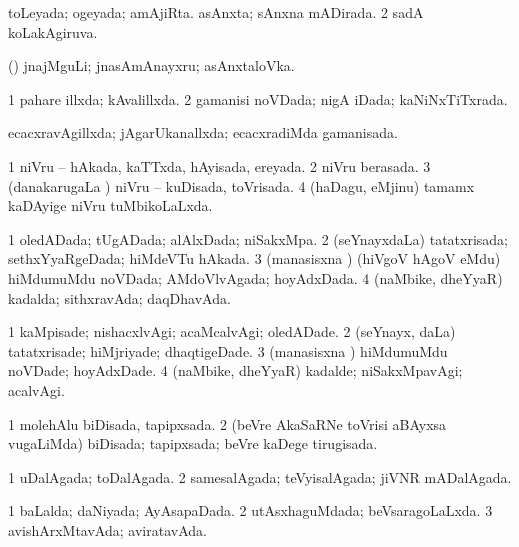 {{\bentry
{} 
\gl{\gu}
\expl{}
\bmng
\bnum
{} 
\banum
{} toLeyada; ogeyada; amAjiRta. 
 asAnxta; sAnxna mADirada. 
\eanum
\numie
\num{2} sadA koLakAgiruva. 
\enum
\emng

\noindent
\gl{\pagu}
\expl{}
\bmng
{} (\AmA) jnajMguLi; jnasAmAnayxru; asAnxtaloVka. 
\emng
\eentry

\bentry 
{} 
\gl{\gu}
\expl{}
\bmng
\bnum
\num{1} pahare illxda; kAvalillxda. 
\num{2} gamanisi noVDada; nigA iDada; kaNiNxTiTxrada. 
\enum
\emng
\eentry

\bentry
{} 
\gl{\gu}
\expl{}
\bmng
ecacxravAgillxda; jAgarUkanallxda; ecacxradiMda gamanisada. 
\emng
\eentry

\bentry
{} 
\gl{\gu}
\expl{}
\bmng
\bnum
\num{1} niVru -- hAkada, kaTTxda, hAyisada, ereyada. 
\num{2} niVru berasada. 
\num{3} (danakarugaLa \vi) niVru -- kuDisada, toVrisada. 
\num{4} (haDagu, eMjinu) tamamx kaDAyige niVru tuMbikoLaLxda. 
\enum
\emng
\eentry

\bentry
{} 
\gl{\gu}
\expl{}
\bmng
\bnum
\num{1} oledADada; tUgADada; alAlxDada; niSakxMpa. 
\num{2} (seYnayxdaLa) tatatxrisada; sethxYyaRgeDada; hiMdeVTu hAkada. 
\num{3} (manasisxna \vi) (hiVgoV hAgoV eMdu) hiMdumuMdu noVDada; AMdoVlvAgada; hoyAdxDada. 
\num{4} (naMbike, dheYyaR) kadalda; sithxravAda; daqDhavAda. 
\enum
\emng
\eentry

\bentry
{} 
\gl{\kirxvi}
\expl{}
\bmng
\bnum
\num{1} kaMpisade; nishacxlvAgi; acaMcalvAgi; oledADade. 
\num{2} (seYnayx, daLa) tatatxrisade; hiMjriyade; dhaqtigeDade. 
\num{3} (manasisxna \vi) hiMdumuMdu noVDade; hoyAdxDade. 
\num{4} (naMbike, dheYyaR) kadalde; niSakxMpavAgi; acalvAgi. 
\enum
\emng
\eentry

\bentry
{} 
\gl{\gu}
\expl{}
\bmng
\bnum
\num{1} molehAlu biDisada, tapipxsada. 
\num{2} (beVre AkaSaRNe toVrisi aBAyxsa \mo vugaLiMda) biDisada; tapipxsada; beVre kaDege tirugisada. 
\enum
\emng
\eentry

\bentry
{} 
\gl{\gu}
\expl{}
\bmng
\bnum
\num{1} uDalAgada; toDalAgada. 
\num{2} samesalAgada; teVyisalAgada; jiVNR mADalAgada. 
\enum
\emng
\eentry

\bentry
{} 
\gl{\gu}
\expl{}
\bmng
\bnum
\num{1} baLalda; daNiyada; AyAsapaDada. 
\num{2} utAsxhaguMdada; beVsaragoLaLxda. 
\num{3} avishArxMtavAda; aviratavAda. 
\enum
\emng
\eentry

}}

